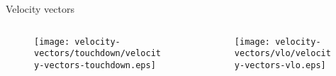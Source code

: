 \begin{frame}{Velocity vectors}%
    \begin{columns}[T,onlytextwidth]%
        \begin{column}[T]{0.5\textwidth}%
            \begin{figure}[htb]%
                \centering%
                \texttt{[image: velocity-vectors/touchdown/velocity-vectors-touchdown.eps]}
            \end{figure}%
        \end{column}%
        \begin{column}[T]{0.5\textwidth}%
            \begin{figure}[htb]%
                \centering%
                \texttt{[image: velocity-vectors/vlo/velocity-vectors-vlo.eps]}
            \end{figure}%
        \end{column}%
    \end{columns}%
\end{frame}%
%